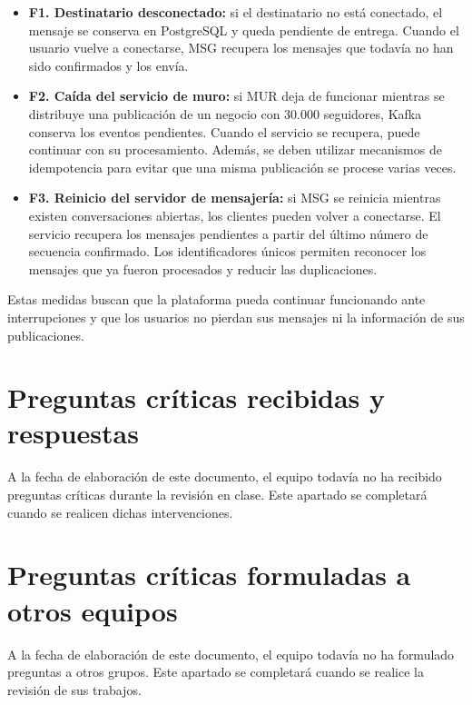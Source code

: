 \documentclass[12pt,a4paper]{article}
\begin{document}
\begin{itemize}

    \item \textbf{F1. Destinatario desconectado:} si el destinatario no está conectado, el mensaje se conserva en PostgreSQL y queda pendiente de entrega. Cuando el usuario vuelve a conectarse, MSG recupera los mensajes que todavía no han sido confirmados y los envía.

    \item \textbf{F2. Caída del servicio de muro:} si MUR deja de funcionar mientras se distribuye una publicación de un negocio con 30.000 seguidores, Kafka conserva los eventos pendientes. Cuando el servicio se recupera, puede continuar con su procesamiento. Además, se deben utilizar mecanismos de idempotencia para evitar que una misma publicación se procese varias veces.

    \item \textbf{F3. Reinicio del servidor de mensajería:} si MSG se reinicia mientras existen conversaciones abiertas, los clientes pueden volver a conectarse. El servicio recupera los mensajes pendientes a partir del último número de secuencia confirmado. Los identificadores únicos permiten reconocer los mensajes que ya fueron procesados y reducir las duplicaciones.

\end{itemize}

Estas medidas buscan que la plataforma pueda continuar funcionando ante interrupciones y que los usuarios no pierdan sus mensajes ni la información de sus publicaciones.

\section{Preguntas críticas recibidas y respuestas}

A la fecha de elaboración de este documento, el equipo
todavía no ha recibido preguntas críticas durante la
revisión en clase. Este apartado se completará cuando
se realicen dichas intervenciones.


\section{Preguntas críticas formuladas a otros equipos}

A la fecha de elaboración de este documento, el equipo
todavía no ha formulado preguntas a otros grupos.
Este apartado se completará cuando se realice la
revisión de sus trabajos.
\end{document}
